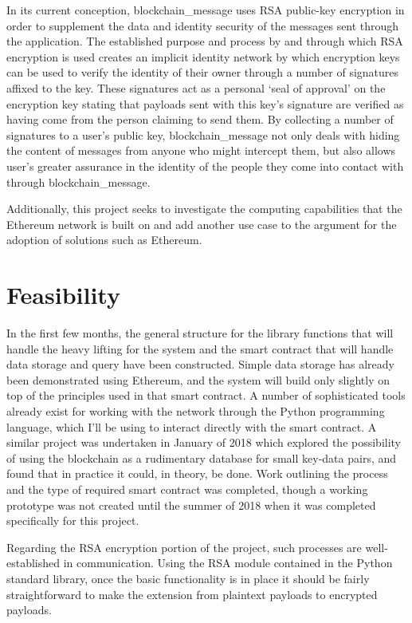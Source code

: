 \documentclass[titlepage]{report}
\begin{document}
In its current conception, blockchain\_message uses RSA public-key encryption in order to supplement the data and identity security of the messages sent through the application. The established purpose and process by and through which RSA encryption is used creates an implicit identity network by which encryption keys can be used to verify the identity of their owner through a number of signatures affixed to the key. These signatures act as a personal `seal of approval' on the encryption key stating that payloads sent with this key's signature are verified as having come from the person claiming to send them. By collecting a number of signatures to a user's public key, blockchain\_message not only deals with hiding the content of messages from anyone who might intercept them, but also allows user's greater assurance in the identity of the people they come into contact with through blockchain\_message.

Additionally, this project seeks to investigate the computing capabilities that the Ethereum network is built on and add another use case to the argument for the adoption of solutions such as Ethereum.

\section{Feasibility}
In the first few months, the general structure for the library functions that will handle the heavy lifting for the system and the smart contract that will handle data storage and query have been constructed. Simple data storage has already been demonstrated using Ethereum\cite{simple-storage}, and the system will build only slightly on top of the principles used in that smart contract. A number of sophisticated tools already exist for working with the network through the Python programming language, which I'll be using to interact directly with the smart contract.\cite{web3-py} A similar project was undertaken in January of 2018 which explored the possibility of using the \gls{blockchain} as a rudimentary database for small key-data pairs, and found that in practice it could, in theory, be done. Work outlining the process and the type of required smart contract was completed, though a working prototype was not created until the summer of 2018 when it was completed specifically for this project.\cite{yadql}

Regarding the RSA encryption portion of the project, such processes are well-established in communication. Using the RSA module contained in the Python standard library, once the basic functionality is in place it should be fairly straightforward to make the extension from plaintext payloads to encrypted payloads.
\end{document}
